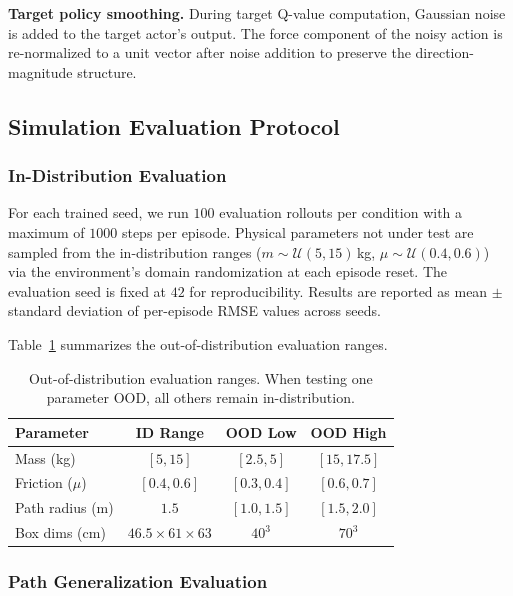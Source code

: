 \noindent\textbf{Target policy smoothing.}
During target Q-value computation, Gaussian noise is added to the target actor's output.
The force component of the noisy action is re-normalized to a unit vector after noise addition to preserve the direction-magnitude structure.

\subsection{Simulation Evaluation Protocol}
\label{app:eval}

\subsubsection{In-Distribution Evaluation}

For each trained seed, we run $100$ evaluation rollouts per condition with a maximum of $1000$ steps per episode.
Physical parameters not under test are sampled from the in-distribution ranges ($m \sim \mathcal{U}(5, 15)$\,kg, $\mu \sim \mathcal{U}(0.4, 0.6)$) via the environment's domain randomization at each episode reset.
The evaluation seed is fixed at $42$ for reproducibility.
Results are reported as mean $\pm$ standard deviation of per-episode RMSE values across seeds.

Table~\ref{tab:ood_ranges} summarizes the out-of-distribution evaluation ranges.

\begin{table}[h]
\centering
\caption{Out-of-distribution evaluation ranges. When testing one parameter OOD, all others remain in-distribution.}
\label{tab:ood_ranges}
\begin{tabular}{lccc}
\toprule
\textbf{Parameter} & \textbf{ID Range} & \textbf{OOD Low} & \textbf{OOD High} \\
\midrule
Mass (kg)           & $[5, 15]$       & $[2.5, 5]$     & $[15, 17.5]$    \\
Friction ($\mu$)    & $[0.4, 0.6]$    & $[0.3, 0.4]$   & $[0.6, 0.7]$    \\
Path radius (m)     & $1.5$           & $[1.0, 1.5]$   & $[1.5, 2.0]$    \\
Box dims (cm)       & $46.5 \times 61 \times 63$ & $40^3$ & $70^3$     \\
\bottomrule
\end{tabular}
\end{table}

\subsubsection{Path Generalization Evaluation}

